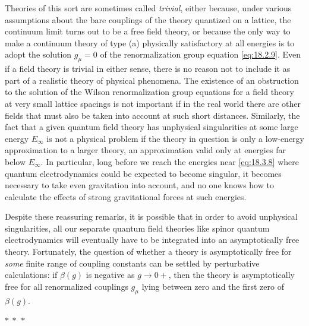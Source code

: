 Theories of this sort are sometimes called \emph{trivial}, either because, under
various assumptions about the bare couplings of the theory quantized on
a lattice, the continuum limit turns out to be a free field theory, or because
the only way to make a continuum theory of type (a) physically satisfactory
at all energies is to adopt the solution $g_\mu=0$ of the renormalization group
equation \eqref{eq:18.2.9}. Even if a field theory is trivial in either sense, there is
no reason not to include it as part of a realistic theory of physical
phenomena. The existence of an obstruction to the solution of the Wilson
renormalization group equations for a field theory at very small lattice
spacings is not important if in the real world there are other fields that
must also be taken into account at such short distances. Similarly, the
fact that a given quantum field theory has unphysical singularities at some
large energy $E_\infty$ is not a physical problem if the theory in question is only a
low-energy approximation to a larger theory, an approximation valid only
at energies far below $E_\infty$. In particular, long before we reach the energies
near \eqref{eq:18.3.8} where quantum electrodynamics could be expected to become
singular, it becomes necessary to take even gravitation into account, and
no one knows how to calculate the effects of strong gravitational forces
at such energies.

Despite these reassuring remarks, it is possible that in order to avoid
unphysical singularities, all our separate quantum field theories like spinor
quantum electrodynamics will eventually have to be integrated into an
asymptotically free theory. Fortunately, the question of whether a theory
is asymptotically free for \emph{some} finite range of coupling constants can be
settled by perturbative calculations: if $\beta(g)$ is negative as $g\to0+$, then
the theory is asymptotically free for all renormalized couplings $g_\mu$ lying
between zero and the first zero of $\beta(g)$.

\begin{center}
$*\ *\ *$
\end{center}


